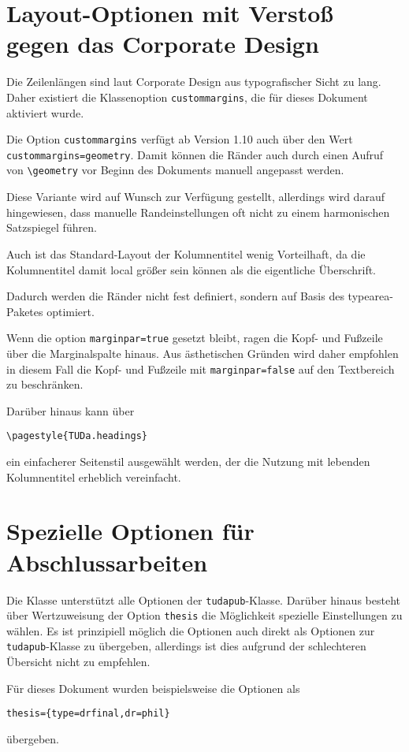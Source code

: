 \documentclass[
	ngerman,
	ruledheaders=chapter,%
	class=book,%
	thesis={
		type=dr,
		dr=rernat
	},
	accentcolor=9c,%
	custommargins=true,%
	marginpar=false,%
	parskip=half-,%
	fontsize=11pt,%
]{tudapub}
\let\file\texttt
\let\code\texttt
\begin{document}
\section{Layout-Optionen mit Verstoß gegen das Corporate Design}
Die Zeilenlängen sind laut Corporate Design aus typografischer Sicht zu lang.
Daher existiert die Klassenoption \code{custommargins}, die für dieses Dokument aktiviert wurde.

Die Option \code{custommargins} verfügt ab Version 1.10 auch über den Wert \code{custommargins=geometry}. Damit können die Ränder auch durch einen Aufruf von \code{\textbackslash{}geometry} vor Beginn des Dokuments manuell angepasst werden.

Diese Variante wird auf Wunsch zur Verfügung gestellt, allerdings wird darauf hingewiesen, dass manuelle Randeinstellungen oft nicht zu einem harmonischen Satzspiegel führen.

Auch ist das Standard-Layout der Kolumnentitel wenig Vorteilhaft, da die Kolumnentitel damit local größer sein können als die eigentliche Überschrift.

	
Dadurch werden die Ränder nicht fest definiert, sondern auf Basis des typearea-Paketes optimiert. 

Wenn die option \code{marginpar=true} gesetzt bleibt, ragen die Kopf- und Fußzeile über die Marginalspalte hinaus. Aus ästhetischen Gründen wird daher empfohlen in diesem Fall die Kopf- und Fußzeile  mit \code{marginpar=false}  auf den Textbereich zu beschränken.
	
	
Darüber hinaus kann über 
\begin{verbatim}
\pagestyle{TUDa.headings}
\end{verbatim}
ein einfacherer Seitenstil ausgewählt werden, der die Nutzung mit lebenden Kolumnentitel erheblich vereinfacht.


\section{Spezielle Optionen für Abschlussarbeiten}
Die Klasse unterstützt alle Optionen der \file{tudapub}-Klasse. Darüber hinaus besteht über Wertzuweisung der Option \code{thesis} die Möglichkeit spezielle Einstellungen zu wählen.
Es ist prinzipiell möglich die Optionen auch direkt als Optionen zur \file{tudapub}-Klasse zu übergeben, allerdings ist dies aufgrund der schlechteren Übersicht nicht zu empfehlen.

Für dieses Dokument wurden beispielsweise die Optionen als 
\begin{verbatim}
thesis={type=drfinal,dr=phil}
\end{verbatim}
übergeben.
\end{document}
